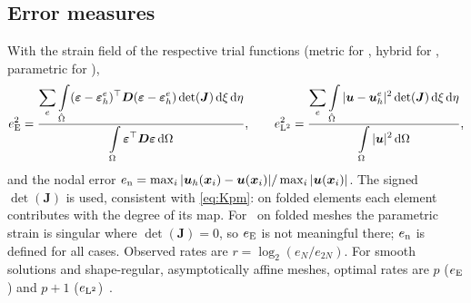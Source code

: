 \subsection{Error measures}\label{sec:errors}
With the strain field of the respective trial functions (metric for \PM, hybrid for \PH,
parametric for \PP),
\begin{equation}
  e_{\mathrm{E}}^2=\frac{\displaystyle\sum\limits_{e}\int\limits_{\hat\Omega}(\bm\varepsilon-\bm\varepsilon_h^e)^\top\bm D
        (\bm\varepsilon-\bm\varepsilon_h^e)\det(\bm J)\,\mathrm{d}\xi\,\mathrm{d}\eta}
       {\displaystyle\int\limits_{\Omega}\bm\varepsilon^\top\bm D\bm\varepsilon\,\mathrm{d}\Omega},
  \qquad
  e_{\mathrm{L}^2}^2=\frac{\displaystyle\sum\limits_{e}\int\limits_{\hat\Omega}|\bm u-\bm u_h^e|^2\det(\bm J)\,\mathrm{d}\xi\,\mathrm{d}\eta}
       {\displaystyle\int\limits_{\Omega}|\bm u|^2\,\mathrm{d}\Omega},
  \label{eq:errors}
\end{equation}
and the nodal error $e_{\mathrm{n}}=\max_i|\bm u_h(\bm{x}_i)-\bm u(\bm{x}_i)|/\max_i|\bm u(\bm{x}_i)|$.
The signed $\det(\bm J)$ is used, consistent with \eqref{eq:Kpm}: on folded elements
each element contributes with the degree of its map. For \PP\ on folded meshes the
parametric strain is singular where $\det(\bm J)=0$, so $e_{\mathrm{E}}$ is not meaningful there;
$e_{\mathrm{n}}$ is defined for all cases. Observed rates are $r=\log_2(e_N/e_{2N})$. For smooth
solutions and shape-regular, asymptotically affine meshes, optimal rates are $p$
($e_{\mathrm{E}}$) and $p+1$ ($e_{\mathrm{L}^2}$)~\cite{Ciarlet1972Interpolation}.

